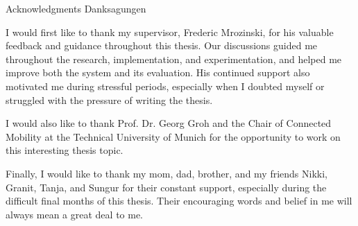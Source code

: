 \makeatletter
{}
{}
{}
\makeatother
\thispagestyle{empty}

\vspace*{20mm}

\begin{center}
\makeatletter
{}
{ Acknowledgments}
{ Danksagungen}
\makeatother
\end{center}

\vspace{10mm}

I would first like to thank my supervisor, Frederic Mrozinski, for his valuable feedback and guidance throughout this thesis. Our discussions guided me throughout the research, implementation, and experimentation, and helped me improve both the system and its evaluation. His continued support also motivated me during stressful periods, especially when I doubted myself or struggled with the pressure of writing the thesis.

I would also like to thank Prof. Dr. Georg Groh and the Chair of Connected Mobility at the Technical University of Munich for the opportunity to work on this interesting thesis topic.

Finally, I would like to thank my mom, dad, brother, and my friends Nikki, Granit, Tanja, and Sungur for their constant support, especially during the difficult final months of this thesis. Their encouraging words and belief in me will always mean a great deal to me. 

\cleardoublepage{}

